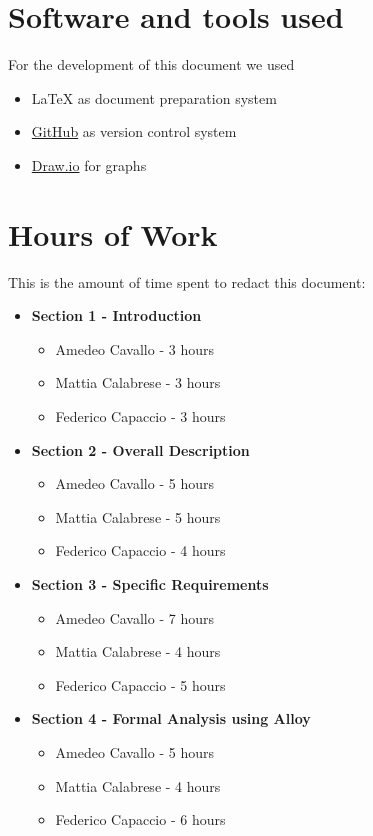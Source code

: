 \begin{appendices}

	\section{Software and tools used}
	For the development of this document we used
	\begin{itemize}
		\item \LaTeX{} as document preparation system
		\item \href{http://github.com}{GitHub} as version control system
		\item \href{http://draw.io}{Draw.io} for graphs
	\end{itemize}
		
	\section{Hours of Work}
	This is the amount of time spent to redact this document:
	\begin{itemize}
		\item \textbf{Section 1 - Introduction}
		\begin{itemize}
			\item Amedeo Cavallo - 3 hours
			\item Mattia Calabrese - 3 hours
			\item Federico Capaccio - 3 hours
		\end{itemize}
		
		\item \textbf{Section 2 - Overall Description}
		\begin{itemize}
			\item Amedeo Cavallo - 5 hours
			\item Mattia Calabrese - 5 hours
			\item Federico Capaccio - 4 hours
		\end{itemize}
		
		\item \textbf{Section 3 - Specific Requirements}
		\begin{itemize}
			\item Amedeo Cavallo - 7 hours
			\item Mattia Calabrese - 4 hours
			\item Federico Capaccio - 5 hours
		\end{itemize}
		
		\item \textbf{Section 4 - Formal Analysis using Alloy}
		\begin{itemize}
			\item Amedeo Cavallo - 5 hours
			\item Mattia Calabrese - 4 hours
			\item Federico Capaccio - 6 hours
		\end{itemize}
	\end{itemize}
	

\end{appendices}

